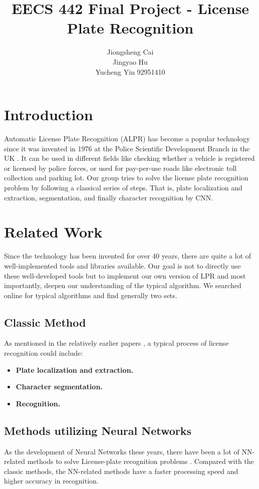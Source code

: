 \documentclass{article}
\title{EECS 442 Final Project - License Plate Recognition}
\author{Jiongsheng Cai\\
			Jingyao Hu\\
			Yucheng Yin 92951410}
\begin{document}
\maketitle
\begin{spacing}{1.0}
\section{Introduction}
Automatic License Plate Recognition (ALPR) has become a popular technology since it was invented in 1976 at the Police Scientific Development Branch in the UK \cite{wikipedia_ANPR}. It can be used in different fields like checking whether a vehicle is registered or licensed by police forces, or used for pay-per-use roads like electronic toll collection and parking lot. Our group tries to solve the license plate recognition problem by following a classical series of steps. That is, plate localization and extraction, segmentation, and finally character recognition by CNN.

\section{Related Work}
Since the technology has been invented for over 40 years, there are quite a lot of well-implemented tools and libraries available. Our goal is not to directly use these well-developed tools but to implement our own version of LPR and most importantly, deepen our understanding of the typical algorithm. We searched online for typical algorithms and find generally two sets. 

\subsection{Classic Method}
As mentioned in the relatively earlier papers \cite{toda2005license}, a typical process of license recognition could include:
\begin{itemize}
	\item \textbf{Plate localization and extraction.}
	
	\item \textbf{Character segmentation.}
	
	\item \textbf{Recognition.}
\end{itemize}

\subsection{Methods utilizing Neural Networks}
As the development of Neural Networks these years, there have been a lot of NN-related methods to solve License-plate recognition problems \cite{Wu2017}. Compared with the classic methods, the NN-related methods have a faster processing speed and higher accuracy in recognition.


\end{spacing}
\end{document}
